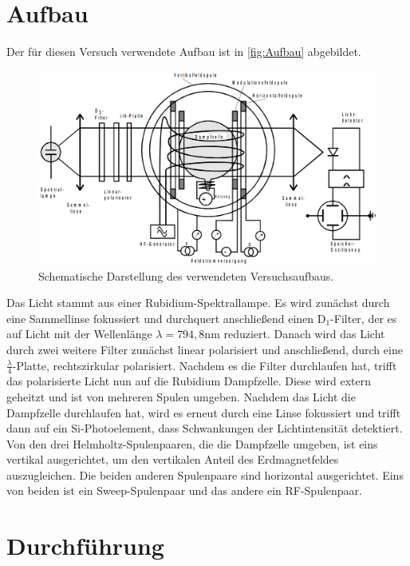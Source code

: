 \section{Aufbau}
\label{sec:Aufbau}

Der für diesen Versuch verwendete Aufbau ist in \autoref{fig:Aufbau} abgebildet.

\begin{figure}[H]
	\centering
	\includegraphics[width=0.6\linewidth]{data/Aufbau.png}
	\caption{Schematische Darstellung des verwendeten Versuchsaufbaus.}
	\label{fig:Aufbau}
\end{figure}

\noindent
Das Licht stammt aus einer Rubidium-Spektrallampe. Es wird zunächst durch eine Sammellinse fokussiert und
durchquert anschließend einen D$_1$-Filter, der es auf Licht mit der Wellenlänge $\lambda = 794,8 \si{\nano\metre}$ reduziert. Danach wird das Licht durch zwei weitere
Filter zunächst linear polarisiert und anschließend, durch eine $\frac{\lambda}{4}$-Platte, rechtszirkular polarisiert. Nachdem es die Filter durchlaufen hat, trifft das polarisierte
Licht nun auf die Rubidium Dampfzelle. Diese wird extern geheitzt und ist von mehreren Spulen umgeben. Nachdem das Licht die Dampfzelle durchlaufen hat, wird es erneut durch eine Linse
fokussiert und trifft dann auf ein Si-Photoelement, dass Schwankungen der Lichtintensität detektiert.
\newline
Von den drei Helmholtz-Spulenpaaren, die die Dampfzelle umgeben, ist eins vertikal ausgerichtet, um den vertikalen Anteil des Erdmagnetfeldes auszugleichen. Die beiden anderen Spulenpaare
sind horizontal ausgerichtet. Eins von beiden ist ein Sweep-Spulenpaar und das andere ein RF-Spulenpaar.


\section{Durchführung}
\label{sec:Durchführung}

